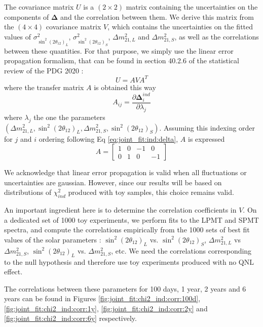 \documentclass[../main.tex]{subfiles}
\begin{document}
The covariance matrix $U$ is a $(2 \times 2)$ matrix containing the uncertainties on the components of $\bm{\Delta}$ and the correlation between them. We derive this matrix from the $(4 \times 4)$ covariance matrix $V$, which contains the uncertainties on the fitted values of $\sigma^2_{\sin^2(2\theta_{12})_L}$, $\sigma^2_{\sin^2(2\theta_{12})_S}$, $\Delta m^2_{21,L}$ and $\Delta m^2_{21,S}$, as well as the correlations between these quantities.
For that purpose, we simply use the linear error propagation formalism, that can be found in section 40.2.6 of the statistical review of the PDG 2020 \cite{particle_data_group_review_2020} :
\begin{equation}
  U = A V A^T
\end{equation}
where the transfer matrix $A$ is obtained this way
\begin{equation}
  A_{ij} = \frac{\partial \bm{\Delta}^{ind}_i}{\partial \lambda_j}
\end{equation}
where $\lambda_j$ the one the parameters $(\Delta m^2_{21,L}, \sin^2(2\theta_{12})_L, \Delta m^2_{21,S}, \sin^2(2\theta_{12})_S)$. Assuming this indexing order for $j$ and $i$ ordering following Eq \ref{eq:joint_fit:ind:delta}, $A$ is expressed
\begin{equation}
  A = \begin{bmatrix}
    1 & 0 & -1 & 0\\
    0 & 1 & 0 & -1
    \end{bmatrix}
\end{equation}


We acknowledge that linear error propagation is valid when all fluctuations or uncertainties are gaussian. However, since our results will be based on distributions of $\chi^2_{ind}$ produced with toy samples, this choice remains valid.


An important ingredient here is to determine the correlation coefficients in $V$. On a dedicated set of 1000 toy experiments, we perform fits to the LPMT and SPMT spectra, and compute the correlations empirically from the 1000 sets of best fit values of the solar parameters :  $\sin^2(2\theta_{12})_{L}$ vs. $\sin^2(2\theta_{12})_{S}$, $\Delta m^2_{21,L}$ vs $\Delta m^2_{21,S}$, $\sin^2(2\theta_{12})_{L}$ vs. $\Delta m^2_{21,S}$, etc. We need the correlations corresponding to the null hypothesis and therefore use toy experiments produced with no QNL effect.

The correlations between these parameters for 100 days, 1 year, 2 years and 6 years can be found in Figures \ref{fig:joint_fit:chi2_ind:corr:100d}, \ref{fig:joint_fit:chi2_ind:corr:1y}, \ref{fig:joint_fit:chi2_ind:corr:2y} and \ref{fig:joint_fit:chi2_ind:corr:6y} respectively.
\end{document}
